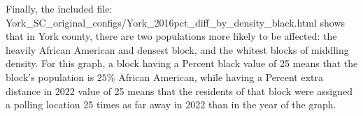 \documentclass[11pt]{article}
\theoremstyle{remark}
\theoremstyle{definition}
\begin{document}
Finally, the included file: \textrm{York\_SC\_original\_configs/York\_2016pct\_diff\_by\_density\_black.html} shows that in York county, there are two populations more likely to be affected: the heavily African American and densest block, and the whitest blocks of middling density. For this graph, a block having a Percent black value of 25 means that the block's population is $25\%$ African American, while having a Percent extra distance in 2022 value of 25 means that the residents of that block were assigned a polling location 25 times as far away in 2022 than in the year of the graph.
\end{document}

